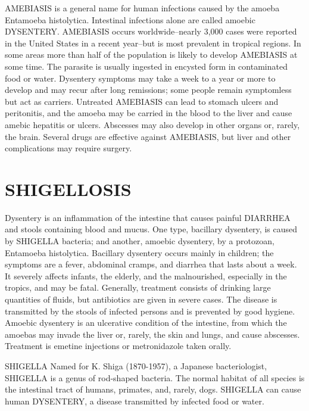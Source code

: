 AMEBIASIS is a general name for human infections caused by the 
amoeba Entamoeba histolytica.  Intestinal infections alone are 
called amoebic DYSENTERY.  AMEBIASIS occurs worldwide--nearly 
3,000 cases were reported in the United States in a recent 
year--but is most prevalent in tropical regions.  In some 
areas more than half of the population is likely to develop 
AMEBIASIS at some time.  The parasite is usually ingested in 
encysted form in contaminated food or water.  Dysentery 
symptoms may take a week to a year or more to develop and may 
recur after long remissions;  some people remain symptomless 
but act as carriers.  Untreated AMEBIASIS can lead to stomach 
ulcers and peritonitis, and the amoeba may be carried in the 
blood to the liver and cause amebic hepatitis or ulcers.  
Abscesses may also develop in other organs or, rarely, the 
brain.  Several drugs are effective against AMEBIASIS, but 
liver and other complications may require surgery. 

\newpage
\section*{SHIGELLOSIS} 

Dysentery is an inflammation of the intestine that causes 
painful DIARRHEA and stools containing blood and mucus.  One 
type, bacillary dysentery, is caused by SHIGELLA bacteria;  
and another, amoebic dysentery, by a protozoan, Entamoeba 
histolytica.  Bacillary dysentery occurs mainly in children; 
the symptoms are a fever, abdominal cramps, and diarrhea that 
lasts about a week.  It severely affects infants, the elderly, 
and the malnourished, especially in the tropics, and may be 
fatal.  Generally, treatment consists of drinking large 
quantities of fluids, but antibiotics are given in severe 
cases.  The disease is transmitted by the stools of infected 
persons and is prevented by good hygiene.  Amoebic dysentery 
is an ulcerative condition of the intestine, from which the 
amoebas may invade the liver or, rarely, the skin and lungs, 
and cause abscesses.  Treatment is emetine injections or 
metronidazole taken orally. 


SHIGELLA Named for K. Shiga (1870-1957), a Japanese bacteriologist, 
SHIGELLA is a genus of rod-shaped bacteria.  The normal 
habitat of all species is the intestinal tract of humans, 
primates, and, rarely, dogs.  SHIGELLA can cause human 
DYSENTERY, a disease transmitted by infected food or water. 


